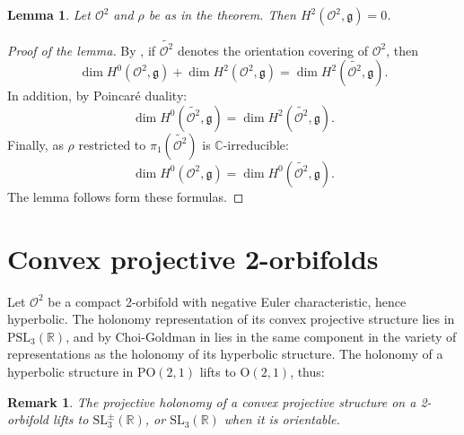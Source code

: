 \documentclass[a4paper,11pt]{article}
\newtheorem{Lemma}[Theorem]{Lemma}
\newtheorem{Remark}[Theorem]{Remark}
\begin{document}
%
%



\begin{Lemma}
\label{LemmaH20}
 Let $\mathcal O^2$ and $\rho$ be as in the theorem. 
 Then $H^2(\mathcal O^2,\mathfrak g)=0$. 
\end{Lemma}

\begin{proof}[Proof of the lemma]
 By \cite[Lemma~3.6]{PortiDim}, if $\widetilde{\mathcal O^2}$ denotes the 
 orientation covering of $\mathcal O^2$, then 
 $$
 \dim H^0(\mathcal O^2,\mathfrak g)+
 \dim H^2(\mathcal O^2,\mathfrak g) =
 \dim H^2(\widetilde{\mathcal O^2},\mathfrak g).
 $$
 In addition, by Poincaré duality:
 $$
 \dim H^0(\widetilde{\mathcal O^2},\mathfrak g)
=
 \dim H^2(\widetilde{\mathcal O^2},\mathfrak g).
 $$
 Finally,
 as $\rho$ restricted to $\pi_1( \widetilde{\mathcal O^2})$
 is $\mathbb C$-irreducible:
 $$
  \dim H^0(\mathcal O^2,\mathfrak g)=
 \dim H^0(\widetilde{\mathcal O^2},\mathfrak g).
 $$
The lemma follows form these formulas. 
\end{proof}
 
 


 
 


\section{Convex projective 2-orbifolds}
\label{Section:proj2}


Let $\mathcal O^2$ be a compact 2-orbifold with 
negative Euler characteristic, hence hyperbolic.
The holonomy representation of its 
convex projective structure lies in
$\mathrm{PSL}_3(\mathbb R)$, and by Choi-Goldman
\cite{ChoiGoldman} in lies in the same component
in the variety of representations as the holonomy of
its hyperbolic structure.
The holonomy of a hyperbolic structure in $\mathrm{PO}(2,1)$ lifts to
$\mathrm{O}(2,1)$, thus:


\begin{Remark}
\label{Remark:lift}
The projective holonomy of a convex projective structure on a 2-orbifold lifts to
 $\mathrm{SL}^{\pm}_3(\mathbb R)$, or 
$\mathrm{SL}_3(\mathbb R)$ when it is orientable. 
\end{Remark}
\end{document}
